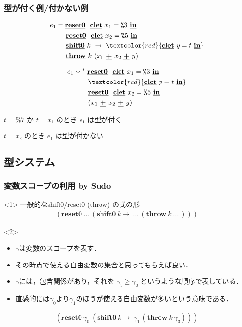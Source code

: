 \documentclass[dvipdfmx,cjk,xcolor=dvipsnames,envcountsect,notheorems,12pt]{beamer}
\newcommand\cResetz{\underline{\textbf{reset0}}}
\newcommand\cShiftz{\underline{\textbf{shift0}}}
\newcommand\cThrow{\underline{\textbf{throw}}}
\newcommand\cPlus{\underline{\textbf{+}}}
\newcommand\cLet{\underline{\textbf{clet}}}
\newcommand\cIn{\underline{\textbf{in}}}
\newcommand\csp[1]{\texttt{\%}{#1}}
\newcommand\ord{\ge}
\newcommand\too{\leadsto^*}
\newcommand\red[1]{\textcolor{red}{#1}}
\theoremstyle{definition}
\begin{document}
\begin{frame}
  \frametitle{型が付く例/付かない例}
  \begin{align*}
    e_1 & = \cResetz ~~\cLet~x_1=\csp{3}~\cIn \\
        & \phantom{=}~~ \cResetz ~~\cLet~x_2=\csp{5}~\cIn \\
        & \phantom{=}~~ \cShiftz~k~\to~ \red{\cLet~y=t~\cIn} \\
        & \phantom{=}~~ \cThrow~k~(x_1~\cPlus~x_2~\cPlus~y)
  \end{align*}

  \pause

  \begin{align*}
    e_1 & \too \cResetz ~~\cLet~x_1=\csp{3}~\cIn \\
        & \phantom{\too}~~ \red{\cLet~y=t~\cIn} \\
        & \phantom{\too}~~ \cResetz ~~\cLet~x_2=\csp{5}~\cIn \\
        & \phantom{\too}~~ (x_1~\cPlus~x_2~\cPlus~y)
  \end{align*}

  \pause
  $t=\csp{7}$ か $t=x_1$ のとき $e_1$ は型が付く

  $t=x_2$ のとき $e_1$ は型が付かない

\end{frame}
\subsection{型システム}
\begin{frame}
  \frametitle{変数スコープの利用 by Sudo}
  \begin{onlyenv}<1>
    一般的なshift0/reset0 (throw) の式の形
    \begin{align*}
      (\cResetz ~...~ (\cShiftz ~k \to ~...~ (\cThrow ~k ~...~)))
    \end{align*}
  \end{onlyenv}

  \begin{onlyenv}<2>
    \begin{itemize}
    \item $\gamma$は変数のスコープを表す．
    \item その時点で使える自由変数の集合と思ってもらえば良い．
    \item $\gamma$には，包含関係があり，それを $\gamma_1 \ord \gamma_0$ というような順序で表している．
    \item 直感的には$\gamma_0$より$\gamma_1$のほうが使える自由変数が多いという意味である．
    \end{itemize}

    \begin{align*}
      (\cResetz ~\gamma_0~ (\cShiftz ~k \to ~\gamma_1~ (\cThrow ~k ~\gamma_3)))
    \end{align*}
  \end{onlyenv}
\end{frame}
\end{document}
